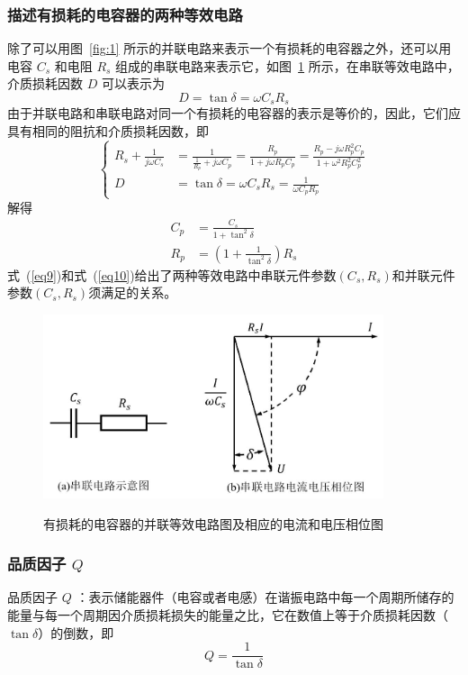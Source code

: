 \documentclass[a4paper,utf8]{article}
\newcommand{\fgref}[1]{图~\ref{#1} }
\newcommand{\seqref}[1]{式~(\ref{#1})}
\begin{document}
        \subsubsection{描述有损耗的电容器的两种等效电路}
            除了可以用\fgref{fig:1}所示的并联电路来表示一个有损耗的电容器之外，还可以用电容 $C_s$ 和电阻 $R_s$ 组成的串联电路来表示它，如\fgref{fig:2} 所示，在串联等效电路中，介质损耗因数 $D$ 可以表示为
            \begin{equation}
                D=\tan \delta=\omega C_s R_s
            \end{equation}
            由于并联电路和串联电路对同一个有损耗的电容器的表示是等价的，因此，它们应具有相同的阻抗和介质损耗因数，即
            \begin{equation*}
                    \left\{ \begin{aligned}
                        R_s+\frac{1}{j\omega C_s}&=\frac{1}{\frac{1}{R_p}+j\omega C_p}=\frac{R_p}{1+j\omega R_pC_p}=\frac{R_p-j\omega R_p^2C_p}{1+\omega^2R_p^2C_p^2}\\
                        D&=\tan\delta=\omega C_sR_s=\frac{1}{\omega C_pR_p}
                    \end{aligned} \right.
            \end{equation*}
            解得
            \begin{align}
                C_p&=\frac{C_s}{1+\tan^2 \delta}\label{eq9}\\[.5em]
                R_p&=\left( 1+\frac{1}{\tan^2 \delta} \right) R_s\label{eq10}
            \end{align}
            \seqref{eq9}和\seqref{eq10}给出了两种等效电路中串联元件参数$(C_s,R_s)$和并联元件参数$(C_s,R_s)$须满足的关系。
            \begin{figure}[!ht]\centering
                \includegraphics[width=100mm]{fg2.jpg}\
                \caption{有损耗的电容器的并联等效电路图及相应的电流和电压相位图\label{fig:2}}
            \end{figure}
        \subsubsection{品质因子 $Q$}
            品质因子 $Q$ ：表示储能器件（电容或者电感）在谐振电路中每一个周期所储存的能量与每一个周期因介质损耗损失的能量之比，它在数值上等于介质损耗因数（$\tan\delta$）的倒数，即
            \begin{equation}
                Q=\frac{1}{\tan\delta}\label{eq11}
            \end{equation}
\end{document}
